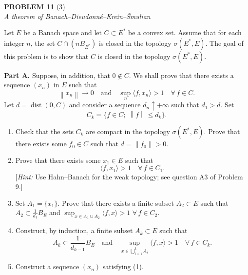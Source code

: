 \documentclass[12pt]{article}
\newcommand{\norm}[1]{\left\|#1\right\|}
\newcommand{\ip}[2]{\langle #1, #2 \rangle}
\begin{document}
\bigskip

\noindent\textbf{PROBLEM 11} (3)\\[4pt]
\textit{A theorem of Banach--Dieudonn\'e--Krein--\v{S}mulian}

\medskip

Let $E$ be a Banach space and let $C \subset E^*$ be a convex set. Assume that for each
integer $n$, the set $C \cap (nB_{E^*})$ is closed in the topology $\sigma(E^*, E)$. The goal of this
problem is to show that $C$ is closed in the topology $\sigma(E^*, E)$.

\medskip

\noindent\textbf{Part A.} Suppose, in addition, that $0 \notin C$. We shall prove that there exists a
sequence $(x_n)$ in $E$ such that
\begin{equation}\tag{1}
\norm{x_n} \to 0 \quad \text{and} \quad \sup_n \ip{f}{x_n} > 1 \quad \forall\, f \in C.
\end{equation}
Let $d = \operatorname{dist}(0, C)$ and consider a sequence $d_n \uparrow +\infty$ such that $d_1 > d$. Set
\[
C_k = \{f \in C;\; \norm{f} \le d_k\}.
\]

\begin{enumerate}
\item Check that the sets $C_k$ are compact in the topology $\sigma(E^*, E)$. Prove that there
exists some $f_0 \in C$ such that $d = \norm{f_0} > 0$.

\item Prove that there exists some $x_1 \in E$ such that
\[
\ip{f}{x_1} > 1 \quad \forall\, f \in C_1.
\]
[\textit{Hint:} Use Hahn--Banach for the weak topology; see question A3 of Problem 9.]

\item Set $A_1 = \{x_1\}$. Prove that there exists a finite subset $A_2 \subset E$ such that
$A_2 \subset \frac{1}{d_1}B_E$ and $\sup_{x \in A_1 \cup A_2}\ip{f}{x} > 1$ $\forall\, f \in C_2$.

\noindent[\textit{Hint:} For each finite subset $A \subset E$ such that $A \subset \frac{1}{d_1}B_E$ consider the set
\[
Y_A = \left\{f \in C_2;\; \sup_{x \in A_1 \cup A} \ip{f}{x} \le 1\right\},
\]
and prove first that $\bigcap_A Y_A = \emptyset$.]

\item Construct, by induction, a finite subset $A_k \subset E$ such that
\[
A_k \subset \frac{1}{d_{k-1}}B_E \quad \text{and} \quad
\sup_{x \in \bigcup_{i=1}^k A_i} \ip{f}{x} > 1 \quad \forall\, f \in C_k.
\]

\item Construct a sequence $(x_n)$ satisfying (1).
\end{enumerate}
\end{document}
